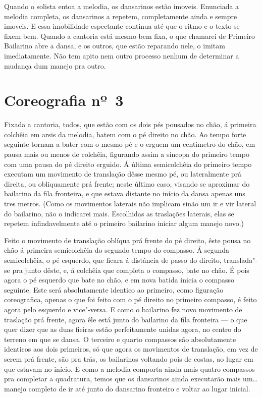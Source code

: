 Quando o solista entoa a melodia, os dansarinos estão imoveis. Enunciada
a melodia completa, os dansarinos a repetem, completamente ainda e
sempre imoveis. E essa imobilidade espectante continua até que o ritmo e
o texto se fixem bem. Quando a cantoria está mesmo bem fixa, o que
chamarei de Primeiro Bailarino abre a dansa, e os outros, que estão
reparando nele, o imitam imediatamente. Não tem apito nem outro processo
nenhum de determinar a mudança dum manejo pra outro.

\section{Coreografia nº~3}

Fixada a cantoria, todos, que estão com os dois pés pousados no chão, á
primeira colchêia em arsis da melodia, batem com o pé direito no chão.
Ao tempo forte seguinte tornam a bater com o mesmo pé e o erguem um
centimetro do chão, em pausa mais ou menos de colchêia, figurando assim
a síncopa do primeiro tempo com uma pausa do pé direito erguido. Á
última semicolchêia do primeiro tempo executam um movimento de
translação dêsse mesmo pé, ou lateralmente prá direita, ou obliquamente
prá frente; neste último caso, visando se aproximar do bailarino da fila
fronteira, e que estava distante no início da dansa apenas uns tres
metros. (Como os movimentos laterais não implicam sinão um ir e vir
lateral do bailarino, não o indicarei mais. Escolhidas as traslações
laterais, elas se repetem infindavelmente até o primeiro bailarino
iniciar algum manejo novo.)

Feito o movimento de translação oblíqua prá frente do pé direito, êste
pousa no chão á primeira semicolchêia do segundo tempo do compasso. Á
segunda semicolchêia, o pé esquerdo, que ficara á distância de passo do
direito, translada"-se pra junto dêste, e, á colchêia que completa o
compasso, bate no chão. É pois agora o pé esquerdo que bate no chão, e
em nova batida inicia o compasso seguinte. Este será absolutamente
identico ao primeiro, como figuração coreografica, apenas o que foi
feito com o pé direito no primeiro compasso, é feito agora pelo esquerdo
e vice"-versa. E como o bailarino fez novo movimento de traslação prá
frente, agora êle está junto do bailarino da fila fronteira --- o que
quer dizer que as duas fieiras estão perfeitamente unidas agora, no
centro do terreno em que se dansa. O terceiro e quarto compassos são
absolutamente identicos aos dois primeiros, só que agora os movimentos
de translação, em vez de serem prá frente, são pra trás, os bailarinos
voltando pois de costas, ao lugar em que estavam no início. E como a
melodia comporta ainda mais quatro compassos pra completar a quadratura,
temos que os dansarinos ainda executarão mais um\ldots{} manejo completo de
ir até junto do dansarino fronteiro e voltar ao lugar inicial.

